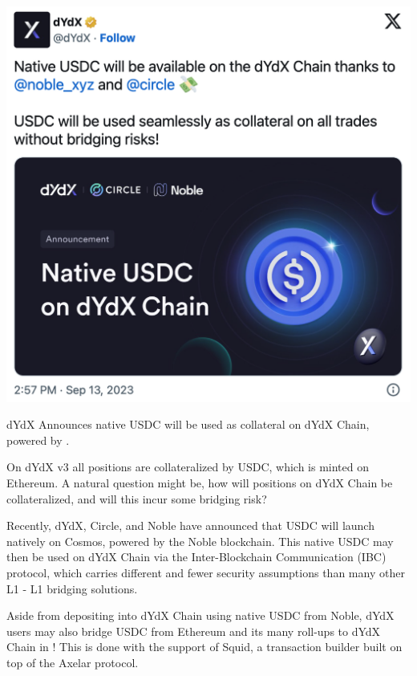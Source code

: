         \begin{marginfigure}
            \centering
            \includegraphics[width=\linewidth]{figs/usdc_announcement.png}
            \caption{dYdX Announces native USDC will be used as collateral on dYdX Chain, powered by .}
            \label{fig:usdc_announcement}
        \end{marginfigure}

        On dYdX v3 all positions are collateralized by USDC, which is minted on Ethereum. A natural question might be, how will positions on dYdX Chain be collateralized, and will this incur some bridging risk? 
        
        Recently, dYdX, Circle, and Noble have announced that USDC will launch natively on Cosmos, powered by the Noble blockchain. This native USDC may then be used on dYdX Chain via the Inter-Blockchain Communication (IBC) protocol, which carries different and fewer security assumptions than many other L1 - L1 bridging solutions.

        Aside from depositing into dYdX Chain using native USDC from Noble, dYdX users may also bridge USDC from Ethereum and its many roll-ups to dYdX Chain in ! This is done with the support of Squid, a transaction builder built on top of the Axelar protocol.

